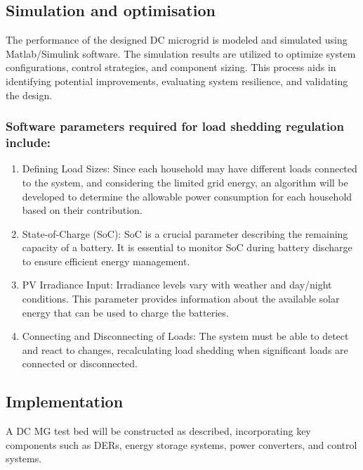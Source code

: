 \subsection{Simulation and optimisation}
The performance of the designed DC microgrid is modeled and simulated using Matlab/Simulink software. The simulation results are utilized to optimize system configurations, control strategies, and component sizing. This process aids in identifying potential improvements, evaluating system resilience, and validating the design.
\subsubsection{Software parameters required for load shedding regulation include:}
\begin{enumerate}
	\item Defining Load Sizes: Since each household may have different loads connected to the system, and considering the limited grid energy, an algorithm will be developed to determine the allowable power consumption for each household based on their contribution.
	\item State-of-Charge (SoC): SoC is a crucial parameter describing the remaining capacity of a battery. It is essential to monitor SoC during battery discharge to ensure efficient energy management.
	\item PV Irradiance Input: Irradiance levels vary with weather and day/night conditions. This parameter provides information about the available solar energy that can be used to charge the batteries.
	\item Connecting and Disconnecting of Loads: The system must be able to detect and react to changes, recalculating load shedding when significant loads are connected or disconnected.
\end{enumerate}
\subsection{Implementation}
A DC MG test bed will be constructed as described, incorporating key components such as DERs, energy storage systems, power converters, and control systems.


